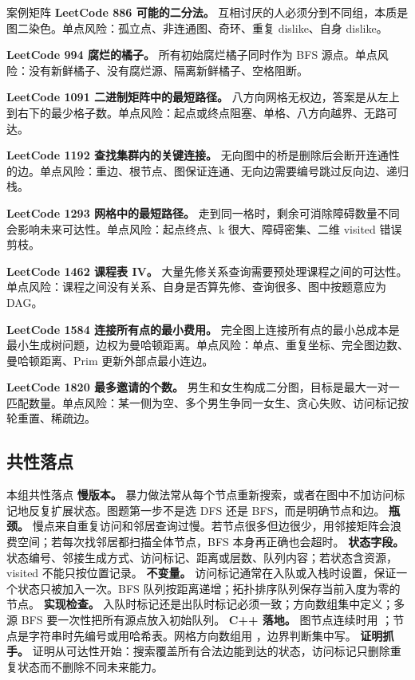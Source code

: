 \begin{principlebox}{案例矩阵}
\textbf{LeetCode 886 可能的二分法。}
互相讨厌的人必须分到不同组，本质是图二染色。单点风险：孤立点、非连通图、奇环、重复 dislike、自身 dislike。

\textbf{LeetCode 994 腐烂的橘子。}
所有初始腐烂橘子同时作为 BFS 源点。单点风险：没有新鲜橘子、没有腐烂源、隔离新鲜橘子、空格阻断。

\textbf{LeetCode 1091 二进制矩阵中的最短路径。}
八方向网格无权边，答案是从左上到右下的最少格子数。单点风险：起点或终点阻塞、单格、八方向越界、无路可达。

\textbf{LeetCode 1192 查找集群内的关键连接。}
无向图中的桥是删除后会断开连通性的边。单点风险：重边、根节点、图保证连通、无向边需要编号跳过反向边、递归栈。

\textbf{LeetCode 1293 网格中的最短路径。}
走到同一格时，剩余可消除障碍数量不同会影响未来可达性。单点风险：起点终点、k 很大、障碍密集、二维 visited 错误剪枝。

\textbf{LeetCode 1462 课程表 IV。}
大量先修关系查询需要预处理课程之间的可达性。单点风险：课程之间没有关系、自身是否算先修、查询很多、图中按题意应为 DAG。

\textbf{LeetCode 1584 连接所有点的最小费用。}
完全图上连接所有点的最小总成本是最小生成树问题，边权为曼哈顿距离。单点风险：单点、重复坐标、完全图边数、曼哈顿距离、Prim 更新外部点最小连边。

\textbf{LeetCode 1820 最多邀请的个数。}
男生和女生构成二分图，目标是最大一对一匹配数量。单点风险：某一侧为空、多个男生争同一女生、贪心失败、访问标记按轮重置、稀疏边。

\end{principlebox}

\subsection{共性落点}

\begin{principlebox}{本组共性落点}
\textbf{慢版本。} 暴力做法常从每个节点重新搜索，或者在图中不加访问标记地反复扩展状态。图题第一步不是选 DFS 还是 BFS，而是明确节点和边。
\textbf{瓶颈。} 慢点来自重复访问和邻居查询过慢。若节点很多但边很少，用邻接矩阵会浪费空间；若每次找邻居都扫描全体节点，BFS 本身再正确也会超时。
\textbf{状态字段。} 状态编号、邻接生成方式、访问标记、距离或层数、队列内容；若状态含资源，visited 不能只按位置记录。
\textbf{不变量。} 访问标记通常在入队或入栈时设置，保证一个状态只被加入一次。BFS 队列按距离递增；拓扑排序队列保存当前入度为零的节点。
\textbf{实现检查。} 入队时标记还是出队时标记必须一致；方向数组集中定义；多源 BFS 要一次性把所有源点放入初始队列。
\textbf{C++ 落地。} 图节点连续时用 ；节点是字符串时先编号或用哈希表。网格方向数组用 ，边界判断集中写。
\textbf{证明抓手。} 证明从可达性开始：搜索覆盖所有合法边能到达的状态，访问标记只删除重复状态而不删除不同未来能力。
\end{principlebox}

